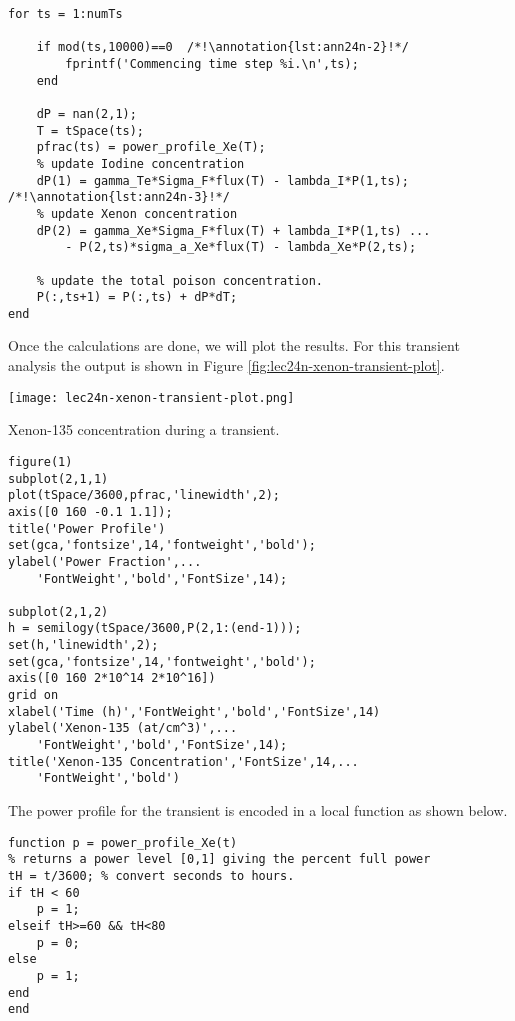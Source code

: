 \begin{lstlisting}[style=myMatlab,name=lec24n-ex1]
%% Commence time stepping
for ts = 1:numTs      

    if mod(ts,10000)==0  /*!\annotation{lst:ann24n-2}!*/
        fprintf('Commencing time step %i.\n',ts);
    end       
     
    dP = nan(2,1);
    T = tSpace(ts);
    pfrac(ts) = power_profile_Xe(T);
    % update Iodine concentration
    dP(1) = gamma_Te*Sigma_F*flux(T) - lambda_I*P(1,ts);  /*!\annotation{lst:ann24n-3}!*/
    % update Xenon concentration
    dP(2) = gamma_Xe*Sigma_F*flux(T) + lambda_I*P(1,ts) ...
        - P(2,ts)*sigma_a_Xe*flux(T) - lambda_Xe*P(2,ts);  
          
    % update the total poison concentration.
    P(:,ts+1) = P(:,ts) + dP*dT;    
end
\end{lstlisting}

\noindent Once the calculations are done, we will plot the results.  For this transient analysis the output is shown in Figure \ref{fig:lec24n-xenon-transient-plot}.
\begin{marginfigure}[2.5cm]
\texttt{[image: lec24n-xenon-transient-plot.png]}
\caption{Xenon-135 concentration during a transient.}
\label{fig:lec24n-xenon-transient-plot}
\end{marginfigure}
\begin{lstlisting}[style=myMatlab,name=lec24n-ex1]
%% Plot your results
figure(1)
subplot(2,1,1)
plot(tSpace/3600,pfrac,'linewidth',2);
axis([0 160 -0.1 1.1]);
title('Power Profile')
set(gca,'fontsize',14,'fontweight','bold');
ylabel('Power Fraction',...
    'FontWeight','bold','FontSize',14);

subplot(2,1,2)
h = semilogy(tSpace/3600,P(2,1:(end-1)));
set(h,'linewidth',2);
set(gca,'fontsize',14,'fontweight','bold');
axis([0 160 2*10^14 2*10^16])
grid on
xlabel('Time (h)','FontWeight','bold','FontSize',14)
ylabel('Xenon-135 (at/cm^3)',...
    'FontWeight','bold','FontSize',14);
title('Xenon-135 Concentration','FontSize',14,...
    'FontWeight','bold')
\end{lstlisting}
The power profile for the transient is encoded in a local function as shown below.
\begin{lstlisting}[style=myMatlab,name=lec24n-ex1]
%% Local Functions
function p = power_profile_Xe(t)
% returns a power level [0,1] giving the percent full power
tH = t/3600; % convert seconds to hours.
if tH < 60
    p = 1;
elseif tH>=60 && tH<80
    p = 0;
else
    p = 1;
end
end
\end{lstlisting}

